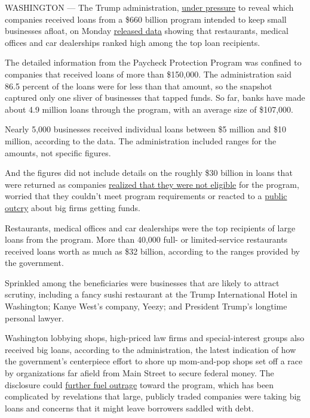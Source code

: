 WASHINGTON --- The Trump administration,
\href{https://www.nytimes.com/2020/06/15/us/politics/coronavirus-ppp-trump-congress.html}{under
pressure} to reveal which companies received loans from a \$660 billion
program intended to keep small businesses afloat, on Monday
\href{https://home.treasury.gov/news/press-releases/sm1052}{released
data} showing that restaurants, medical offices and car dealerships
ranked high among the top loan recipients.

The detailed information from the Paycheck Protection Program was
confined to companies that received loans of more than \$150,000. The
administration said 86.5 percent of the loans were for less than that
amount, so the snapshot captured only one sliver of businesses that
tapped funds. So far, banks have made about 4.9 million loans through
the program, with an average size of \$107,000.

Nearly 5,000 businesses received individual loans between \$5 million
and \$10 million, according to the data. The administration included
ranges for the amounts, not specific figures.

And the figures did not include details on the roughly \$30 billion in
loans that were returned as companies
\href{https://www.nytimes.com/2020/06/10/business/Small-business-loans-ppp.html}{realized
that they were not eligible} for the program, worried that they couldn't
meet program requirements or reacted to a
\href{https://www.nytimes.com/2020/04/28/us/politics/coronavirus-treasury-payment-protection-program.html}{public
outcry} about big firms getting funds.

Restaurants, medical offices and car dealerships were the top recipients
of large loans from the program. More than 40,000 full- or
limited-service restaurants received loans worth as much as \$32
billion, according to the ranges provided by the government.

Sprinkled among the beneficiaries were businesses that are likely to
attract scrutiny, including a fancy sushi restaurant at the Trump
International Hotel in Washington; Kanye West's company, Yeezy; and
President Trump's longtime personal lawyer.

Washington lobbying shops, high-priced law firms and special-interest
groups also received big loans, according to the administration, the
latest indication of how the government's centerpiece effort to shore up
mom-and-pop shops set off a race by organizations far afield from Main
Street to secure federal money. The disclosure could
\href{https://www.nytimes.com/2020/04/28/us/politics/coronavirus-treasury-payment-protection-program.html}{further
fuel outrage} toward the program, which has been complicated by
revelations that large, publicly traded companies were taking big loans
and concerns that it might leave borrowers saddled with debt.


